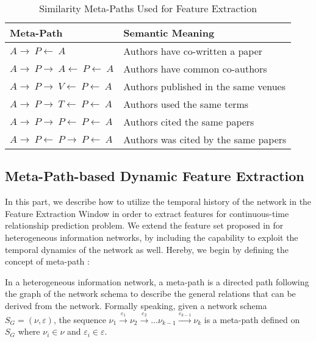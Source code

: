 \begin{table}[t]
	\centering
	\caption{Similarity Meta-Paths Used for Feature Extraction \cite{sun2012will}}
	\label{table:meta}
	\scriptsize
	\begin{tabu} to \columnwidth {X[c] X[l]}
		\toprule
		Meta-Path & Semantic Meaning \\
		\midrule
		$A\rightarrow~P\leftarrow~A$ & Authors have co-written a paper\\
		$A\rightarrow~P\rightarrow~A\leftarrow~P\leftarrow~A$ & Authors have common co-authors\\
		$A\rightarrow~P\rightarrow~V\leftarrow~P\leftarrow~A$ & Authors published in the same venues\\
		$A\rightarrow~P\rightarrow~T\leftarrow~P\leftarrow~A$ & Authors used the same terms\\
		$A\rightarrow~P\rightarrow~P\leftarrow~P\leftarrow~A$ & Authors cited the same papers\\
		$A\rightarrow~P\leftarrow~P\rightarrow~P\leftarrow~A$ & Authors was cited by the same papers\\
		\bottomrule
	\end{tabu}
\end{table}

\subsection{Meta-Path-based Dynamic Feature Extraction}
In this part, we describe how to utilize the temporal history of the network in the Feature Extraction Window in order to extract features for continuous-time relationship prediction problem. We extend the feature set proposed in \cite{sun2012will} for heterogeneous information networks, by including the capability to exploit the temporal dynamics of the network as well. Hereby, we begin by defining the concept of meta-path \cite{sun2011pathsim}:

\begin{definition}
In a heterogeneous information network, a meta-path is a directed path following the graph of the network schema to describe the general relations that can be derived from the network. Formally speaking, given a network schema $S_G=(\nu, \varepsilon)$, the sequence $\nu_1\xrightarrow{\varepsilon_1}\nu_2\xrightarrow{\varepsilon_2}\dots\nu_{k-1}\xrightarrow{\varepsilon_{k-1}}\nu_k$ is a meta-path defined on $S_G$ where $\nu_i\in \nu$ and $\varepsilon_i\in \varepsilon$.
\end{definition} 

